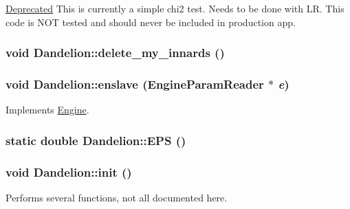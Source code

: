 \begin{Desc}
\item[\hyperlink{deprecated__deprecated000001}{Deprecated}]This is currently a simple chi2 test. Needs to be done with LR. This code is NOT tested and should never be included in production app.\end{Desc}
\hypertarget{classDandelion_adafc0b99e228f6bdfba301f129e17145}{
\subsubsection[{delete\_\-my\_\-innards}]{\setlength{\rightskip}{0pt plus 5cm}void Dandelion::delete\_\-my\_\-innards ()}}
\label{classDandelion_adafc0b99e228f6bdfba301f129e17145}
\hypertarget{classDandelion_ac95a20aaaff8170c4539e047cb7a551a}{
\subsubsection[{enslave}]{\setlength{\rightskip}{0pt plus 5cm}void Dandelion::enslave ({\bf EngineParamReader} $\ast$ {\em e})}}
\label{classDandelion_ac95a20aaaff8170c4539e047cb7a551a}


Implements \hyperlink{classEngine_a023e094182312b1732fe53754c2fe5cb}{Engine}.

\hypertarget{classDandelion_a8679c05d30fc55999636726595c070ad}{
\subsubsection[{EPS}]{\setlength{\rightskip}{0pt plus 5cm}static double Dandelion::EPS ()}}
\label{classDandelion_a8679c05d30fc55999636726595c070ad}
\hypertarget{classDandelion_a6c58019c7b1d8fb5a80c2031afb01374}{
\subsubsection[{init}]{\setlength{\rightskip}{0pt plus 5cm}void Dandelion::init ()}}
\label{classDandelion_a6c58019c7b1d8fb5a80c2031afb01374}
Performs several functions, not all documented here.

